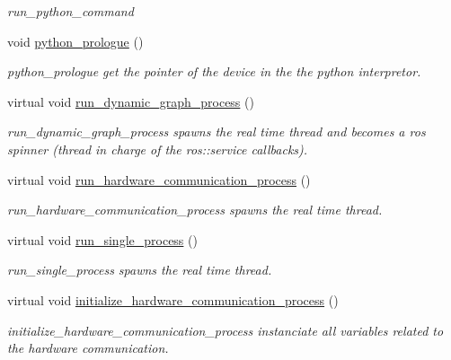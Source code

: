 \begin{DoxyCompactItemize}
\begin{DoxyCompactList}\small\item\em run\+\_\+python\+\_\+command \end{DoxyCompactList}\item 
\mbox{\label{classdynamic__graph_1_1DynamicGraphManager_a11cc3b7fefc7fe146dc112a7e6d55f3d}} 
void \hyperlink{classdynamic__graph_1_1DynamicGraphManager_a11cc3b7fefc7fe146dc112a7e6d55f3d}{python\+\_\+prologue} ()
\begin{DoxyCompactList}\small\item\em python\+\_\+prologue get the pointer of the device in the the python interpretor. \end{DoxyCompactList}\item 
virtual void \hyperlink{classdynamic__graph_1_1DynamicGraphManager_a8e23eb4ce0acaef397bf84a770b9f015}{run\+\_\+dynamic\+\_\+graph\+\_\+process} ()
\begin{DoxyCompactList}\small\item\em run\+\_\+dynamic\+\_\+graph\+\_\+process spawns the real time thread and becomes a ros spinner (thread in charge of the ros\+::service callbacks). \end{DoxyCompactList}\item 
virtual void \hyperlink{classdynamic__graph_1_1DynamicGraphManager_a81e7cb10262383030c10156730d39ce8}{run\+\_\+hardware\+\_\+communication\+\_\+process} ()
\begin{DoxyCompactList}\small\item\em run\+\_\+hardware\+\_\+communication\+\_\+process spawns the real time thread. \end{DoxyCompactList}\item 
virtual void \hyperlink{classdynamic__graph_1_1DynamicGraphManager_ad13f5aef302173293a0c162c28505ef8}{run\+\_\+single\+\_\+process} ()
\begin{DoxyCompactList}\small\item\em run\+\_\+single\+\_\+process spawns the real time thread. \end{DoxyCompactList}\item 
virtual void \hyperlink{classdynamic__graph_1_1DynamicGraphManager_ae3927887762c52c7bf50ab5a565c3077}{initialize\+\_\+hardware\+\_\+communication\+\_\+process} ()
\begin{DoxyCompactList}\small\item\em initialize\+\_\+hardware\+\_\+communication\+\_\+process instanciate all variables related to the hardware communication. \end{DoxyCompactList}\item 

\end{DoxyCompactItemize}
